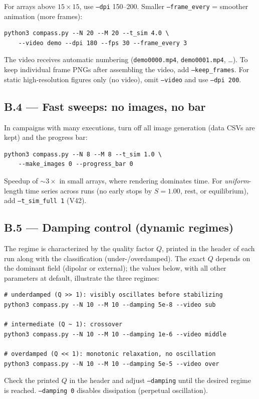\documentclass[11pt,a4paper]{article}
\newcommand{\code}[1]{\texttt{#1}}
\begin{document}
For arrays above $15\times15$, use \code{--dpi} 150--200. Smaller \code{--frame\_every} = smoother animation (more frames):
\begin{verbatim}
python3 compass.py --N 20 --M 20 --t_sim 4.0 \
    --video demo --dpi 180 --fps 30 --frame_every 3
\end{verbatim}
The video receives automatic numbering (\code{demo0000.mp4}, \code{demo0001.mp4}, \dots). To keep individual frame PNGs after assembling the video, add \code{--keep\_frames}. For static high-resolution figures only (no video), omit \code{--video} and use \code{--dpi 200}.

\subsection*{B.4 --- Fast sweeps: no images, no bar}

In campaigns with many executions, turn off all image generation (data CSVs are kept) and the progress bar:
\begin{verbatim}
python3 compass.py --N 8 --M 8 --t_sim 1.0 \
    --make_images 0 --progress_bar 0
\end{verbatim}
Speedup of $\sim 3\times$ in small arrays, where rendering dominates time. For \emph{uniform}-length time series across runs (no early stops by $S{=}1.00$, rest, or equilibrium), add \code{--t\_sim\_full 1} (V42).

\subsection*{B.5 --- Damping control (dynamic regimes)}

The regime is characterized by the quality factor $Q$, printed in the header of each run along with the classification (under-/overdamped). The exact $Q$ depends on the dominant field (dipolar or external); the values below, with all other parameters at default, illustrate the three regimes:
\begin{verbatim}
# underdamped (Q >> 1): visibly oscillates before stabilizing
python3 compass.py --N 10 --M 10 --damping 5e-8 --video sub

# intermediate (Q ~ 1): crossover
python3 compass.py --N 10 --M 10 --damping 1e-6 --video middle

# overdamped (Q << 1): monotonic relaxation, no oscillation
python3 compass.py --N 10 --M 10 --damping 5e-5 --video over
\end{verbatim}
Check the printed $Q$ in the header and adjust \code{--damping} until the desired regime is reached. \code{--damping 0} disables dissipation (perpetual oscillation).
\end{document}
